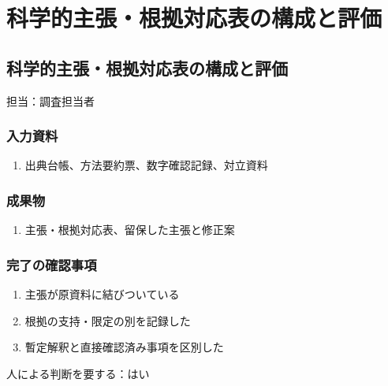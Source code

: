 \documentclass[a4paper,11pt]{article}
\begin{document}
\section{科学的主張・根拠対応表の構成と評価}
\subsection{科学的主張・根拠対応表の構成と評価}
\par 担当：調査担当者\par\medskip
\subsubsection*{入力資料}
\begin{enumerate}[leftmargin=2em,itemsep=0.35em]
\item 出典台帳、方法要約票、数字確認記録、対立資料
\end{enumerate}
\subsubsection*{成果物}
\begin{enumerate}[leftmargin=2em,itemsep=0.35em]
\item 主張・根拠対応表、留保した主張と修正案
\end{enumerate}
\subsubsection*{完了の確認事項}
\begin{enumerate}[leftmargin=2em,itemsep=0.35em]
\item 主張が原資料に結びついている
\item 根拠の支持・限定の別を記録した
\item 暫定解釈と直接確認済み事項を区別した
\end{enumerate}
\par 人による判断を要する：はい\par\medskip
\end{document}
